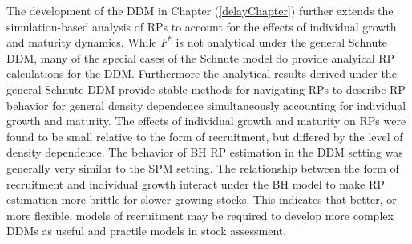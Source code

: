 \documentclass[12pt]{ucscthesis}
\begin{document}

%
The development of the DDM in Chapter (\ref{delayChapter}) further 
extends the simulation-based analysis of RPs to account for the effects of 
individual growth and maturity dynamics. While $F^*$ is not analytical 
under the general Schnute DDM, many of the special cases of the Schnute model 
do provide analyical RP calculations for the DDM.
Furthermore the analytical results derived under the general Schnute DDM 
provide stable methods for navigating RPs to describe RP behavior for 
general density dependence simultaneously accounting for individual growth 
and maturity. %
The effects of individual growth and maturity on RPs were found to be small 
relative to the form of recruitment, but differed by the level of density 
dependence. The behavior of BH RP estimation in the DDM setting was generally 
very similar to the SPM setting. The relationship between the form of recruitment 
and individual growth interact under the BH model to make RP estimation more 
brittle for slower growing stocks. This indicates that better, or more flexible, 
models of recruitment may be required to develop more complex DDMs as useful 
and practile models in stock assessment. 

\end{document}
